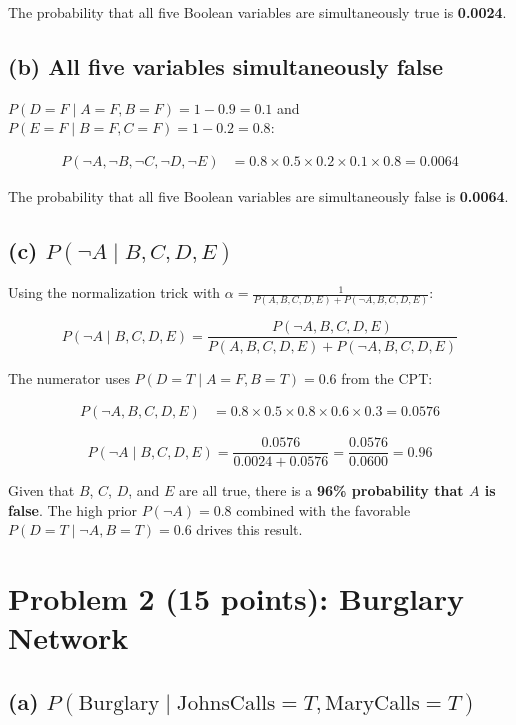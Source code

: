 \documentclass[12pt]{article}
\begin{document}
The probability that all five Boolean variables are simultaneously true is \textbf{0.0024}.

\subsection*{(b) All five variables simultaneously false}

$P(D{=}F\mid A{=}F,B{=}F)=1-0.9=0.1$ and $P(E{=}F\mid B{=}F,C{=}F)=1-0.2=0.8$:

\begin{align*}
P(\neg A,\neg B,\neg C,\neg D,\neg E)
  &= 0.8\times0.5\times0.2\times0.1\times0.8 = \boxed{0.0064}
\end{align*}

The probability that all five Boolean variables are simultaneously false is \textbf{0.0064}.

\subsection*{(c) $P(\neg A \mid B,C,D,E)$}

Using the normalization trick with
$\alpha=\tfrac{1}{P(A,B,C,D,E)+P(\neg A,B,C,D,E)}$:

\[
P(\neg A\mid B,C,D,E)
  =\frac{P(\neg A,B,C,D,E)}{P(A,B,C,D,E)+P(\neg A,B,C,D,E)}
\]

The numerator uses $P(D{=}T\mid A{=}F,B{=}T)=0.6$ from the CPT:

\begin{align*}
P(\neg A,B,C,D,E)
  &= 0.8\times0.5\times0.8\times0.6\times0.3 = 0.0576
\end{align*}

\[
P(\neg A\mid B,C,D,E)
  =\frac{0.0576}{0.0024+0.0576}
  =\frac{0.0576}{0.0600}
  =\boxed{0.96}
\]

Given that $B$, $C$, $D$, and $E$ are all true, there is a \textbf{96\% probability that $A$ is false}.
The high prior $P(\neg A)=0.8$ combined with the favorable $P(D{=}T\mid\neg A,B{=}T)=0.6$
drives this result.

\newpage
\section{Problem 2 (15 points): Burglary Network}

\subsection*{(a) $P(\text{Burglary}\mid\text{JohnsCalls}=T,\text{MaryCalls}=T)$}
\end{document}
